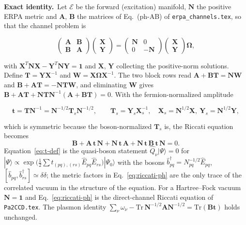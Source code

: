 \documentclass[aip,jcp,reprint,noshowkeys,superscriptaddress]{revtex4-1}
\newcommand{\bI}{\boldsymbol{1}}
\newcommand{\bA}{\boldsymbol{A}}
\newcommand{\bB}{\boldsymbol{B}}
\newcommand{\bN}{\boldsymbol{N}}
\newcommand{\bX}{\boldsymbol{X}}
\newcommand{\bY}{\boldsymbol{Y}}
\newcommand{\Exact}{\textbf{Exact identity.}\ }
\newcommand{\bt}{\boldsymbol{t}}
\newcommand{\bT}{\boldsymbol{T}}
\newcommand{\bW}{\boldsymbol{W}}
\begin{document}
\Exact Let $\mathcal E$ be the forward (excitation) manifold, $\bN$ the
positive ERPA metric and $\bA$, $\bB$ the matrices of
Eq.~(ph-AB) of \texttt{erpa\_channels.tex}, so that the channel problem is
\begin{widetext}
\begin{equation}
  \begin{pmatrix}\bA&\bB\\ \bB&\bA\end{pmatrix}
  \begin{pmatrix}\bX\\ \bY\end{pmatrix}
  =\begin{pmatrix}\bN&0\\0&-\bN\end{pmatrix}
  \begin{pmatrix}\bX\\ \bY\end{pmatrix}\boldsymbol\Omega ,
  \label{eq:ph-gen}
\end{equation}
\end{widetext}
with $\bX^{T}\bN\bX-\bY^{T}\bN\bY=\bI$
and $\bX$, $\bY$ collecting the positive-norm solutions.  Define
$\bT=\bY\bX^{-1}$ and $\bW=\bX\boldsymbol\Omega\bX^{-1}$.  The two block rows
read $\bA+\bB\bT=\bN\bW$ and $\bB+\bA\bT=-\bN\bT\bW$, and eliminating $\bW$
gives $\bB+\bA\bT+\bN\bT\bN^{-1}(\bA+\bB\bT)=0$.  With the
fermion-normalized amplitude
\begin{widetext}
\begin{equation}
  \bt=\bT\bN^{-1}=\bN^{-1/2}\bT_{s}\bN^{-1/2},\qquad
  \bT_s=\bY_s\bX_s^{-1},\quad \bX_s=\bN^{1/2}\bX,\ \bY_s=\bN^{1/2}\bY ,
  \label{eq:t-def}
\end{equation}
\end{widetext}
which is symmetric because the boson-normalized $\bT_s$ is, the Riccati
equation becomes
\begin{equation}
  \bB+\bA\,\bt\,\bN+\bN\,\bt\,\bA+\bN\,\bt\,\bB\,\bt\,\bN=0 .
  \label{eq:riccati-ph}
\end{equation}
Equation~\eqref{eq:t-def} is the quasi-boson statement
$\hat Q_\nu|\Psi\rangle=0$ for
$|\Psi\rangle\propto\exp\bigl(\tfrac12\sum t_{(pq),(rs)}\hat E_{pq}\hat E_{rs}\bigr)|\Psi_0\rangle$
with the bosons $\hat b^\dagger_{pq}=N_{pq}^{-1/2}\hat E_{pq}$, $[\hat b_{pq},\hat b^\dagger_{rs}]\simeq\delta\delta$;
the metric factors in Eq.~\eqref{eq:riccati-ph} are the only trace of the
correlated vacuum in the structure of the equation.  For a Hartree--Fock
vacuum $\bN=\bI$ and Eq.~\eqref{eq:riccati-ph} is the direct-channel Riccati
equation of \texttt{Pa2CCD.tex}.  The plasmon identity
$\sum_\nu\omega_\nu-\mathrm{Tr}\,\bN^{-1/2}\bA\bN^{-1/2}=\mathrm{Tr}(\bB\bt)$
holds unchanged.
\end{document}
